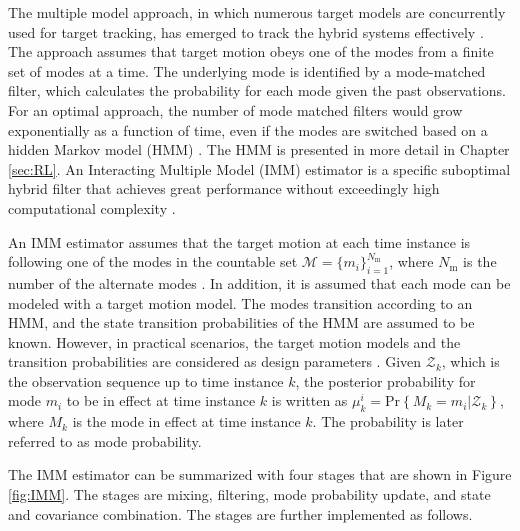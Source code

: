\documentclass[english, 12pt, a4paper, elec, utf8, a-1b, online]{aaltothesis}
\numberwithin{equation}{section}
\renewcommand{\Pr}[1]{\text{Pr}\left\{ #1 \right\}}
\newcommand{\modeprob}{\mu_k^i}
\newcommand{\nmodels}{{N_\text{m}}}
\begin{document}
The multiple model approach, in which numerous target models are concurrently used for target tracking, has emerged to track the hybrid systems effectively \cite{BarShalom2001}.
The approach assumes that target motion obeys one of the modes from a finite set of modes at a time.
The underlying mode is identified by a mode-matched filter, which calculates the probability for each mode given the past observations.
For an optimal approach, the number of mode matched filters would grow exponentially as a function of time, even if the modes are switched based on a hidden Markov model (HMM) \cite{BarShalom2001}.
The HMM is presented in more detail in Chapter \ref{sec:RL}.
An Interacting Multiple Model (IMM) estimator is a specific suboptimal hybrid filter that achieves great performance without exceedingly high computational complexity \cite{BarShalom2001}.

An IMM estimator assumes that the target motion at each time instance is following one of the modes in the countable set $\mathcal{M} = \{ m_i \}_{i=1}^\nmodels$, where $\nmodels$ is the number of the alternate modes \cite{BarShalom2001}.
In addition, it is assumed that each mode can be modeled with a target motion model.
The modes transition according to an HMM, and the state transition probabilities of the HMM are assumed to be known.
However, in practical scenarios, the target motion models and the transition probabilities are considered as design parameters \cite{Simeonova2002}.
Given $\mathcal{Z}_k$, which is the observation sequence up to time instance $k$, the posterior probability for mode $m_i$ to be in effect at time instance $k$ is written as $\modeprob = \Pr{M_k=m_i | \mathcal{Z}_k}$, where $M_k$ is the mode in effect at time instance $k$.
The probability is later referred to as mode probability.

The IMM estimator can be summarized with four stages that are shown in Figure \ref{fig:IMM}.
The stages are mixing, filtering, mode probability update, and state and covariance combination. 
The stages are further implemented as follows.
\end{document}
